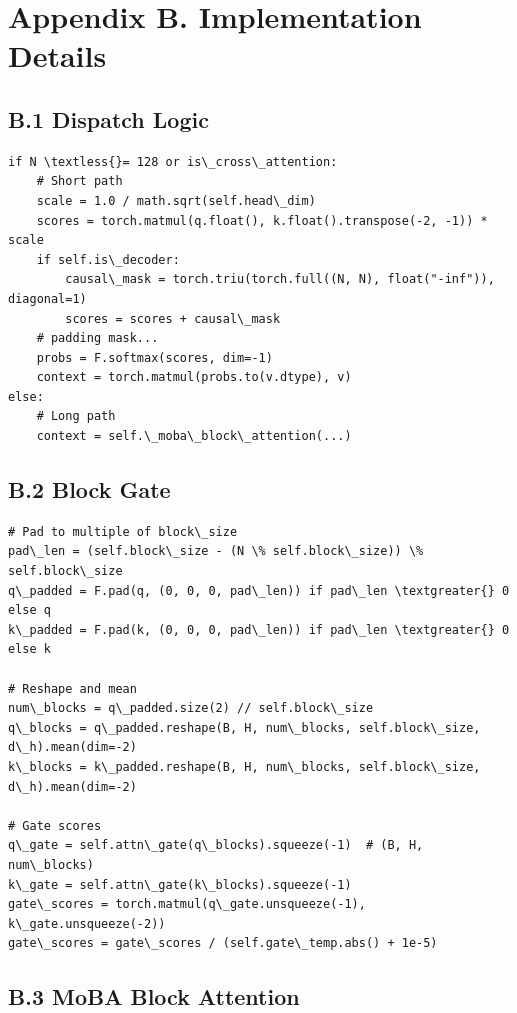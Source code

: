 \section{Appendix B. Implementation Details}

\subsection{B.1 Dispatch Logic}

\begin{lstlisting}
if N \textless{}= 128 or is\_cross\_attention:
    # Short path
    scale = 1.0 / math.sqrt(self.head\_dim)
    scores = torch.matmul(q.float(), k.float().transpose(-2, -1)) * scale
    if self.is\_decoder:
        causal\_mask = torch.triu(torch.full((N, N), float("-inf")), diagonal=1)
        scores = scores + causal\_mask
    # padding mask...
    probs = F.softmax(scores, dim=-1)
    context = torch.matmul(probs.to(v.dtype), v)
else:
    # Long path
    context = self.\_moba\_block\_attention(...)
\end{lstlisting}

\subsection{B.2 Block Gate}

\begin{lstlisting}
# Pad to multiple of block\_size
pad\_len = (self.block\_size - (N \% self.block\_size)) \% self.block\_size
q\_padded = F.pad(q, (0, 0, 0, pad\_len)) if pad\_len \textgreater{} 0 else q
k\_padded = F.pad(k, (0, 0, 0, pad\_len)) if pad\_len \textgreater{} 0 else k

# Reshape and mean
num\_blocks = q\_padded.size(2) // self.block\_size
q\_blocks = q\_padded.reshape(B, H, num\_blocks, self.block\_size, d\_h).mean(dim=-2)
k\_blocks = k\_padded.reshape(B, H, num\_blocks, self.block\_size, d\_h).mean(dim=-2)

# Gate scores
q\_gate = self.attn\_gate(q\_blocks).squeeze(-1)  # (B, H, num\_blocks)
k\_gate = self.attn\_gate(k\_blocks).squeeze(-1)
gate\_scores = torch.matmul(q\_gate.unsqueeze(-1), k\_gate.unsqueeze(-2))
gate\_scores = gate\_scores / (self.gate\_temp.abs() + 1e-5)
\end{lstlisting}

\subsection{B.3 MoBA Block Attention}

